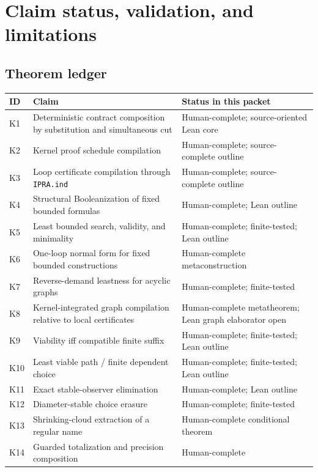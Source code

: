 \section{Claim status, validation, and limitations}\label{sec:status}

\subsection{Theorem ledger}

\begin{longtable}{@{}p{}p{}p{}@{}}
\toprule
ID & Claim & Status in this packet \\
\midrule
\endhead
K1 & Deterministic contract composition by substitution and simultaneous cut & Human-complete; source-oriented Lean core \\
K2 & Kernel proof schedule compilation & Human-complete; source-complete outline \\
K3 & Loop certificate compilation through \texttt{IPRA.ind} & Human-complete; source-complete outline \\
K4 & Structural Booleanization of fixed bounded formulas & Human-complete; Lean outline \\
K5 & Least bounded search, validity, and minimality & Human-complete; finite-tested; Lean outline \\
K6 & One-loop normal form for fixed bounded constructions & Human-complete metaconstruction \\
K7 & Reverse-demand leastness for acyclic graphs & Human-complete; finite-tested \\
K8 & Kernel-integrated graph compilation relative to local certificates & Human-complete metatheorem; Lean graph elaborator open \\
K9 & Viability iff compatible finite suffix & Human-complete; finite-tested; Lean outline \\
K10 & Least viable path / finite dependent choice & Human-complete; finite-tested; Lean outline \\
K11 & Exact stable-observer elimination & Human-complete; Lean outline \\
K12 & Diameter-stable choice erasure & Human-complete; finite-tested \\
K13 & Shrinking-cloud extraction of a regular name & Human-complete conditional theorem \\
K14 & Guarded totalization and precision composition & Human-complete \\

\end{longtable}
